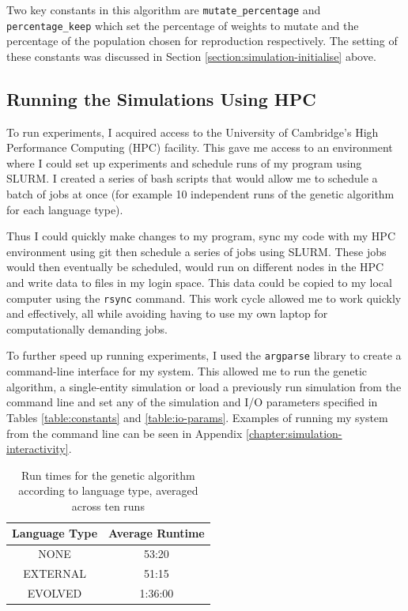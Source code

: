 \documentclass[12pt,a4paper,twoside,openright]{report}
\begin{document}
Two key constants in this algorithm are \texttt{mutate\_percentage} and \texttt{percentage\_keep} which set the percentage of weights to mutate and the percentage of the population chosen for reproduction respectively. The setting of these constants was discussed in Section \ref{section:simulation-initialise} above.

\subsection{Running the Simulations Using HPC}\label{section:running}

To run experiments, I acquired access to the University of Cambridge's High Performance Computing (HPC) facility. This gave me access to an environment where I could set up experiments and schedule runs of my program using SLURM. I created a series of bash scripts that would allow me to schedule a batch of jobs at once (for example 10 independent runs of the genetic algorithm for each language type).

Thus I could quickly make changes to my program, sync my code with my HPC environment using git then schedule a series of jobs using SLURM. These jobs would then eventually be scheduled, would run on different nodes in the HPC and write data to files in my login space. This data could be copied to my local computer using the \texttt{rsync} command. This work cycle allowed me to work quickly and effectively, all while avoiding having to use my own laptop for computationally demanding jobs. 

To further speed up running experiments, I used the \texttt{argparse} library to create a command-line interface for my system. This allowed me to run the genetic algorithm, a single-entity simulation or load a previously run simulation from the command line and set any of the simulation and I/O parameters specified in Tables \ref{table:constants} and \ref{table:io-params}. Examples of running my system from the command line can be seen in Appendix \ref{chapter:simulation-interactivity}.

\begin{table}[t]
\centering
 \begin{tabular}{ c | c}
 \bf{Language Type} & \bf{Average Runtime} \\ [0.5ex] 
 \hline
NONE & 53:20 \\
EXTERNAL & 51:15\\
EVOLVED & 1:36:00 \\
\end{tabular}
\caption{Run times for the genetic algorithm according to language type, averaged across ten runs}
\label{table:runtimes}
\end{table}
\end{document}
